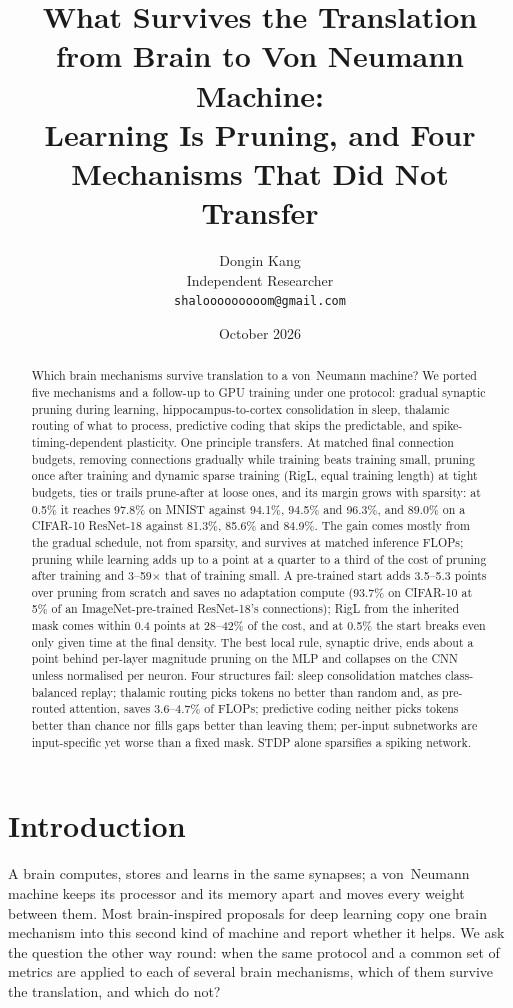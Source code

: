 \documentclass[11pt]{article}
\title{What Survives the Translation from Brain to Von Neumann Machine:\\
Learning Is Pruning, and Four Mechanisms That Did Not Transfer}
\author{%
  Dongin Kang\\
  Independent Researcher\\
  \texttt{shalooooooooom@gmail.com}\\
}
\date{October 2026}
\begin{document}
\maketitle

\begin{abstract}
Which brain mechanisms survive translation to a von~Neumann machine? We ported five mechanisms and a follow-up to GPU training under one protocol: gradual synaptic pruning during learning, hippocampus-to-cortex consolidation in sleep, thalamic routing of what to process, predictive coding that skips the predictable, and spike-timing-dependent plasticity. One principle transfers. At matched final connection budgets, removing connections gradually while training beats training small, pruning once after training and dynamic sparse training (RigL, equal training length) at tight budgets, ties or trails prune-after at loose ones, and its margin grows with sparsity: at 0.5\% it reaches 97.8\% on MNIST against 94.1\%, 94.5\% and 96.3\%, and 89.0\% on a CIFAR-10 ResNet-18 against 81.3\%, 85.6\% and 84.9\%. The gain comes mostly from the gradual schedule, not from sparsity, and survives at matched inference FLOPs; pruning while learning adds up to a point at a quarter to a third of the cost of pruning after training and 3--59$\times$ that of training small. A pre-trained start adds 3.5--5.3 points over pruning from scratch and saves no adaptation compute (93.7\% on CIFAR-10 at 5\% of an ImageNet-pre-trained ResNet-18's connections); RigL from the inherited mask comes within 0.4 points at 28--42\% of the cost, and at 0.5\% the start breaks even only given time at the final density. The best local rule, synaptic drive, ends about a point behind per-layer magnitude pruning on the MLP and collapses on the CNN unless normalised per neuron. Four structures fail: sleep consolidation matches class-balanced replay; thalamic routing picks tokens no better than random and, as pre-routed attention, saves 3.6--4.7\% of FLOPs; predictive coding neither picks tokens better than chance nor fills gaps better than leaving them; per-input subnetworks are input-specific yet worse than a fixed mask. STDP alone sparsifies a spiking network.
\end{abstract}

\section{Introduction}

A brain computes, stores and learns in the same synapses; a von~Neumann machine keeps its processor and its memory apart and
moves every weight between them. Most brain-inspired proposals for deep learning copy one brain mechanism into this second
kind of machine and report whether it helps. We ask the question the other way round: when the same protocol and a common set
of metrics are applied to each of several brain mechanisms, which of them survive the translation, and which do not?
\end{document}
